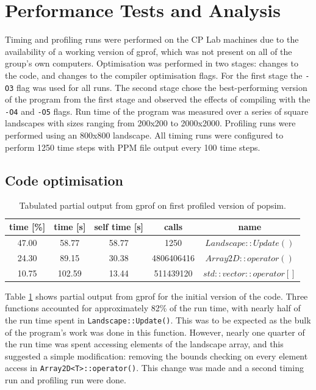 \section{Performance Tests and Analysis}
\label{Performance Tests and Analysis}

Timing and profiling runs were performed on the CP Lab machines due to the availability of a working version of gprof, which was not present on all of the group's own computers.
Optimisation was performed in two stages: changes to the code, and changes to the compiler optimisation flags.  For the first stage the \texttt{-O3} flag was used for all runs.  The second stage chose the best-performing version of the program from the first stage and observed the effects of compiling with the \texttt{-O4} and \texttt{-O5} flags.
Run time of the program was measured over a series of square landscapes with sizes ranging from 200x200 to 2000x2000.
Profiling runs were performed using an 800x800 landscape.
All timing runs were configured to perform 1250 time steps with PPM file output every 100 time steps.


\subsection{Code optimisation}
\label{Code optimisation}

\begin{table}[h!]
\caption{Tabulated partial output from gprof on first profiled version of popsim.}
\label{tab:profile1}
\begin{center}
\begin{tabular}{|c|c|c|c|c|}
\hline
time [\%] & time [s] & self time [s] & calls & name\\
\hline
47.00 & 58.77 & 58.77 & 1250 & $Landscape::Update()$\\
\hline
24.30 & 89.15 & 30.38& 4806406416 & $Array2D::operator()$\\
\hline
10.75& 102.59 & 13.44 & 511439120 & $std::vector::operator[]$\\
\hline
\end{tabular}
\end{center}
\end{table}

Table \ref{tab:profile1} shows partial output from gprof for the initial version of the code.
Three functions accounted for approximately 82\% of the run time, with nearly half of the run time spent in \texttt{Landscape::Update()}.
This was to be expected as the bulk of the program's work was done in this function.
However, nearly one quarter of the run time was spent accessing elements of the landscape array, and this suggested a simple modification: removing the bounds checking on every element access in \texttt{Array2D<T>::operator()}.
This change was made and a second timing run and profiling run were done.

